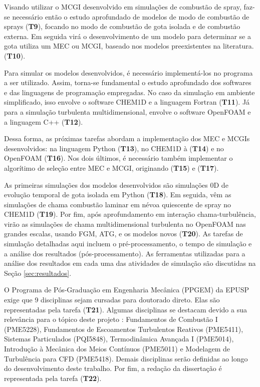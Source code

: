 Visando utilizar o MCGI desenvolvido em simulações de combustão de spray, faz-se necessário então o estudo aprofundado de modelos de modo de combustão de sprays (\textbf{T9}), focando no modo de combustão de gota isolada e de combustão externa. Em seguida virá o desenvolvimento de um modelo para determinar se a gota utiliza um MEC ou MCGI, baseado nos modelos preexistentes na literatura. (\textbf{T10}).

Para simular os modelos desenvolvidos, é necessário implementá-los no programa a ser utilizado.
Assim, torna-se fundamental o estudo aprofundado dos softwares e das linguagens de programação empregadas. 
No caso da simulação em ambiente simplificado, isso envolve o software CHEM1D e a linguagem Fortran (\textbf{T11}).
Já para a simulação turbulenta multidimensional, envolve o software OpenFOAM e a linguagem C++ (\textbf{T12}).

Dessa forma, as próximas tarefas abordam a implementação dos MEC e MCGIs desenvolvidos: na linguagem Python  (\textbf{T13}), no  CHEM1D à  (\textbf{T14}) e no OpenFOAM  (\textbf{T16}).
Nos dois últimos, é necessário também implementar o algorítimo de seleção entre MEC e MCGI, originando (\textbf{T15}) e (\textbf{T17}).  

As primeiras simulações dos modelos desenvolvidos são simulações 0D de evolução temporal de gota isolada em Python (\textbf{T18}). 
Em seguida, vêm as simulações de chama combustão laminar em névoa quiescente de spray no CHEM1D (\textbf{T19}).
Por fim, após aprofundamento em interação chama-turbulência, virão as simulações de chama multidimensional turbulenta no OpenFOAM nas grandes escalas, usando FGM, ATG, e os modelos novos (\textbf{T20}).
As tarefas de simulação detalhadas aqui incluem o pré-processamento, o tempo de simulação e a análise dos resultados (pós-processamento).
As ferramentas utilizadas para a análise dos resultados em cada uma das atividades de simulação são discutidas na Seção \ref{sec:resultados}.

O Programa de Pós-Graduação em Engenharia Mecânica (PPGEM) da EPUSP exige que 9 disciplinas sejam cursadas para doutorado direto.
Elas são representadas pela tarefa (\textbf{T21}).
Algumas disciplinas se destacam devido a sua relevância para o tópico deste projeto : Fundamentos de Combustão I (PME5228), Fundamentos de Escoamentos Turbulentos Reativos  (PME5411), Sistemas Particulados (PQI5848), Termodinâmica Avançada I (PME5014), Introdução à Mecânica dos Meios Contínuos (PME5011) e Modelagem de Turbulência para CFD (PME5418).
Demais disciplinas serão definidas ao longo do desenvolvimento deste trabalho.
Por fim, a redação da dissertação é representada pela tarefa (\textbf{T22}).



